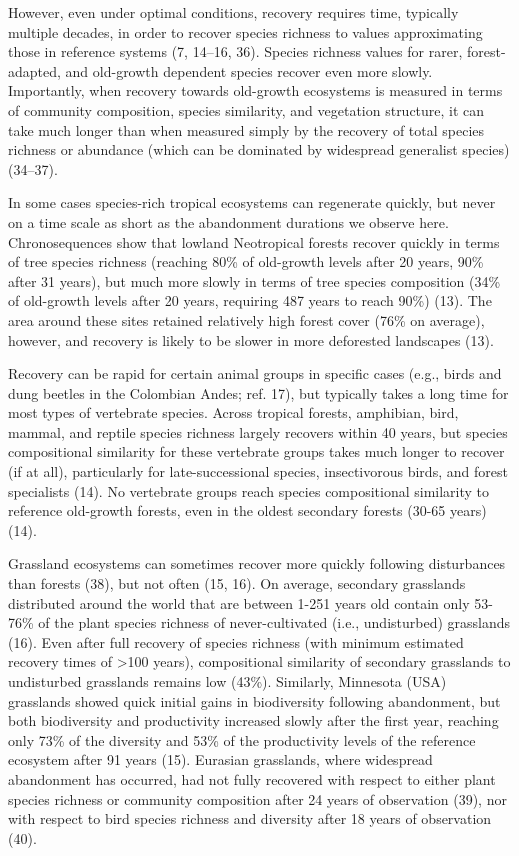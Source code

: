 \documentclass[9pt,twocolumn,twoside,lineno]{pnas-new}
\begin{document}
However, even under optimal conditions, recovery requires time, typically multiple decades, in order to recover species richness to values approximating those in reference systems (7, 14--16, 36).
Species richness values for rarer, forest-adapted, and old-growth dependent species recover even more slowly.
Importantly, when recovery towards old-growth ecosystems is measured in terms of community composition, species similarity, and vegetation structure, it can take much longer than when measured simply by the recovery of total species richness or abundance (which can be dominated by widespread generalist species) (34--37).

In some cases species-rich tropical ecosystems can regenerate quickly, but never on a time scale as short as the abandonment durations we observe here.
Chronosequences show that lowland Neotropical forests recover quickly in terms of tree species richness (reaching 80\% of old-growth levels after 20 years, 90\% after 31 years), but much more slowly in terms of tree species composition (34\% of old-growth levels after 20 years, requiring 487 years to reach 90\%) (13).
The area around these sites retained relatively high forest cover (76\% on average), however, and recovery is likely to be slower in more deforested landscapes (13).

Recovery can be rapid for certain animal groups in specific cases (e.g., birds and dung beetles in the Colombian Andes; ref. 17), but typically takes a long time for most types of vertebrate species.
Across tropical forests, amphibian, bird, mammal, and reptile species richness largely recovers within 40 years, but species compositional similarity for these vertebrate groups takes much longer to recover (if at all), particularly for late-successional species, insectivorous birds, and forest specialists (14).
No vertebrate groups reach species compositional similarity to reference old-growth forests, even in the oldest secondary forests (30-65 years) (14).

Grassland ecosystems can sometimes recover more quickly following disturbances than forests (38), but not often (15, 16).
On average, secondary grasslands distributed around the world that are between 1-251 years old contain only 53-76\% of the plant species richness of never-cultivated (i.e., undisturbed) grasslands (16).
Even after full recovery of species richness (with minimum estimated recovery times of \textgreater100 years), compositional similarity of secondary grasslands to undisturbed grasslands remains low (43\%).
Similarly, Minnesota (USA) grasslands showed quick initial gains in biodiversity following abandonment, but both biodiversity and productivity increased slowly after the first year, reaching only 73\% of the diversity and 53\% of the productivity levels of the reference ecosystem after 91 years (15).
Eurasian grasslands, where widespread abandonment has occurred, had not fully recovered with respect to either plant species richness or community composition after 24 years of observation (39), nor with respect to bird species richness and diversity after 18 years of observation (40).
\end{document}
